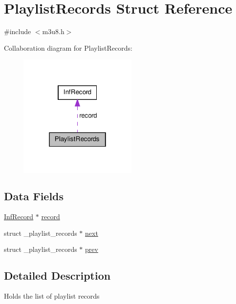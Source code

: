 \hypertarget{struct_playlist_records}{\section{\-Playlist\-Records \-Struct \-Reference}
\label{struct_playlist_records}
}


{\ttfamily \#include $<$m3u8.\-h$>$}



\-Collaboration diagram for \-Playlist\-Records\-:\nopagebreak
\begin{figure}[H]
\begin{center}
\leavevmode
\includegraphics[width=166pt]{struct_playlist_records__coll__graph}
\end{center}
\end{figure}
\subsection*{\-Data \-Fields}
\begin{DoxyCompactItemize}
\item 
\hyperlink{struct_inf_record}{\-Inf\-Record} $\ast$ \hyperlink{struct_playlist_records_a6d58e7a65bc9b1e859cb3bf645693c58}{record}
\item 
struct \-\_\-playlist\-\_\-records $\ast$ \hyperlink{struct_playlist_records_afa50efa7cc40de2ed624be01796ecc5a}{next}
\item 
struct \-\_\-playlist\-\_\-records $\ast$ \hyperlink{struct_playlist_records_a44bec84a5d3a4fe698154f605af3d85e}{prev}
\end{DoxyCompactItemize}


\subsection{\-Detailed \-Description}
\-Holds the list of playlist records 

